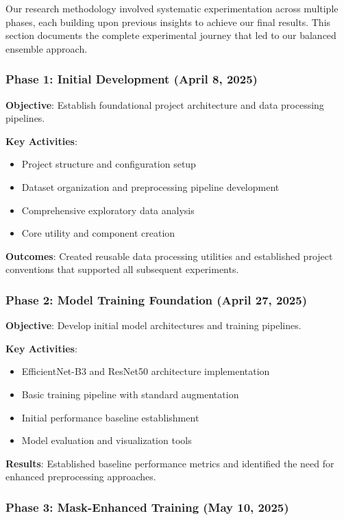 \documentclass[12pt]{article}
\begin{document}
Our research methodology involved systematic experimentation across multiple phases, each building upon previous insights to achieve our final results. This section documents the complete experimental journey that led to our balanced ensemble approach.

\subsubsection{Phase 1: Initial Development (April 8, 2025)}

\textbf{Objective}: Establish foundational project architecture and data processing pipelines.

\textbf{Key Activities}:
\begin{itemize}[itemsep=1pt,parsep=0pt,topsep=2pt]
\item Project structure and configuration setup
\item Dataset organization and preprocessing pipeline development
\item Comprehensive exploratory data analysis
\item Core utility and component creation
\end{itemize}

\textbf{Outcomes}: Created reusable data processing utilities and established project conventions that supported all subsequent experiments.

\subsubsection{Phase 2: Model Training Foundation (April 27, 2025)}

\textbf{Objective}: Develop initial model architectures and training pipelines.

\textbf{Key Activities}:
\begin{itemize}[itemsep=1pt,parsep=0pt,topsep=2pt]
\item EfficientNet-B3 and ResNet50 architecture implementation
\item Basic training pipeline with standard augmentation
\item Initial performance baseline establishment
\item Model evaluation and visualization tools
\end{itemize}

\textbf{Results}: Established baseline performance metrics and identified the need for enhanced preprocessing approaches.

\subsubsection{Phase 3: Mask-Enhanced Training (May 10, 2025)}
\end{document}

